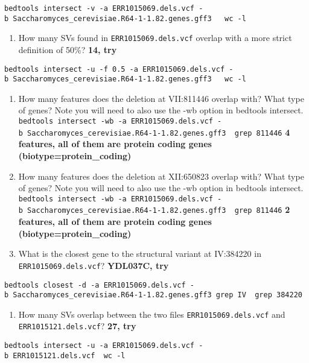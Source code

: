 \documentclass[11pt]{article}
\providecommand{\tightlist}{%
      \setlength{\itemsep}{0pt}\setlength{\parskip}{0pt}}
\begin{document}
\texttt{bedtools\ intersect\ -v\ -a\ ERR1015069.dels.vcf\ -b\ Saccharomyces\_cerevisiae.R64-1-1.82.genes.gff3\ ~\textbar{}\ wc\ -l}

\begin{enumerate}
\def\labelenumi{\arabic{enumi}.}
\setcounter{enumi}{2}
\tightlist
\item
  How many SVs found in \texttt{ERR1015069.dels.vcf} overlap with a more
  strict definition of 50\%? \textbf{14, try}
\end{enumerate}

\texttt{bedtools\ intersect\ -u\ -f\ 0.5\ -a\ ERR1015069.dels.vcf\ -b\ Saccharomyces\_cerevisiae.R64-1-1.82.genes.gff3\ ~\textbar{}\ wc\ -l}

\begin{enumerate}
\def\labelenumi{\arabic{enumi}.}
\setcounter{enumi}{3}
\item
  How many features does the deletion at VII:811446 overlap with? What
  type of genes? Note you will need to also use the -wb option in
  bedtools intersect.
  \texttt{bedtools\ intersect\ -wb\ -a\ ERR1015069.dels.vcf\ -b\ Saccharomyces\_cerevisiae.R64-1-1.82.genes.gff3\ \textbar{}\ grep\ 811446}
  \textbf{4 features, all of them are protein coding genes
  (biotype=protein\_coding)}
\item
  How many features does the deletion at XII:650823 overlap with? What
  type of genes? Note you will need to also use the -wb option in
  bedtools intersect.
  \texttt{bedtools\ intersect\ -wb\ -a\ ERR1015069.dels.vcf\ -b\ Saccharomyces\_cerevisiae.R64-1-1.82.genes.gff3\ \textbar{}\ grep\ 811446}
  \textbf{2 features, all of them are protein coding genes
  (biotype=protein\_coding)}
\item
  What is the closest gene to the structural variant at IV:384220 in
  \texttt{ERR1015069.dels.vcf}? \textbf{YDL037C, try}
\end{enumerate}

\texttt{bedtools\ closest\ -d\ -a\ ERR1015069.dels.vcf\ -b\ Saccharomyces\_cerevisiae.R64-1-1.82.genes.gff3\textbar{}\ grep\ IV\ \textbar{}\ grep\ 384220}

\begin{enumerate}
\def\labelenumi{\arabic{enumi}.}
\setcounter{enumi}{4}
\tightlist
\item
  How many SVs overlap between the two files
  \texttt{ERR1015069.dels.vcf} and \texttt{ERR1015121.dels.vcf}?
  \textbf{27, try}
\end{enumerate}

\texttt{bedtools\ intersect\ -u\ -a\ ERR1015069.dels.vcf\ -b\ ERR1015121.dels.vcf\ \textbar{}\ wc\ -l}
\end{document}
